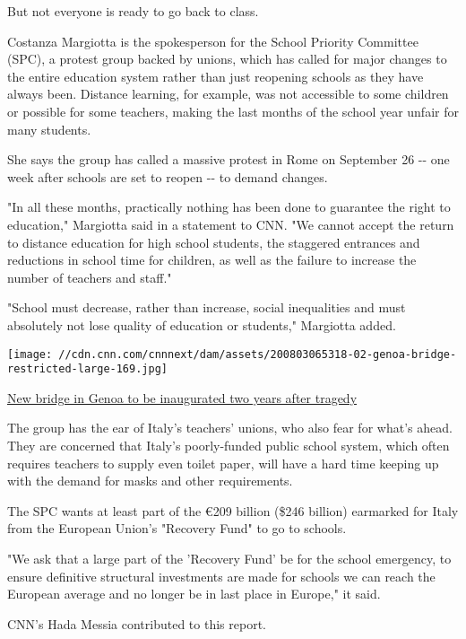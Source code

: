 But not everyone is ready to go back to class.

Costanza Margiotta is the spokesperson for the School Priority Committee
(SPC), a protest group backed by unions, which has called for major
changes to the entire education system rather than just reopening
schools as they have always been. Distance learning, for example, was
not accessible to some children or possible for some teachers, making
the last months of the school year unfair for many students.

She says the group has called a massive protest in Rome on September 26
-\/- one week after schools are set to reopen -\/- to demand changes.

"In all these months, practically nothing has been done to guarantee the
right to education," Margiotta said in a statement to CNN. "We cannot
accept the return to distance education for high school students, the
staggered entrances and reductions in school time for children, as well
as the failure to increase the number of teachers and staff."

"School must decrease, rather than increase, social inequalities and
must absolutely not lose quality of education or students," Margiotta
added.

\href{/style/article/new-genoa-bridge-inauguration-scli-intl/index.html}{}

\texttt{[image: //cdn.cnn.com/cnnnext/dam/assets/200803065318-02-genoa-bridge-restricted-large-169.jpg]}

\href{/style/article/new-genoa-bridge-inauguration-scli-intl/index.html}{New
bridge in Genoa to be inaugurated two years after tragedy}

The group has the ear of Italy's teachers' unions, who also fear for
what's ahead. They are concerned that Italy's poorly-funded public
school system, which often requires teachers to supply even toilet
paper, will have a hard time keeping up with the demand for masks and
other requirements.

The SPC wants at least part of the €209 billion (\$246 billion)
earmarked for Italy from the European Union's "Recovery Fund" to go to
schools.

"We ask that a large part of the 'Recovery Fund' be for the school
emergency, to ensure definitive structural investments are made for
schools we can reach the European average and no longer be in last place
in Europe," it said.

CNN's Hada Messia contributed to this report.

